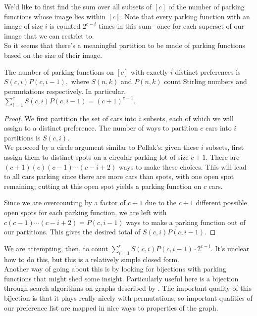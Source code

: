 We'd like to first find the sum over all subsets of $[c]$ of the number of parking functions whose image lies within $[c].$ Note that every parking function with an image of size $i$ is counted $2^{c-i}$ times in this sum-- once for each superset of our image that we can restrict to.\\

So it seems that there's a meaningful partition to be made of parking functions based on the size of their image.

\begin{proposition}
    The number of parking functions on $[c]$ with exactly $i$ distinct preferences is $S(c,i)P(c,i-1),$ where $S(n,k)$ and $P(n,k)$ count Stirling numbers and permutations respectively. In particular, $\displaystyle\sum_{i=1}^{c}S(c,i)P(c,i-1)=(c+1)^{c-1}.$
\end{proposition}

\begin{proof}
    We first partition the set of cars into $i$ subsets, each of which we will assign to a distinct preference. The number of ways to partition $c$ cars into $i$ partitions is $S(c,i).$\\

    We proceed by a circle argument similar to Pollak's: given these $i$ subsets, first assign them to distinct spots on a circular parking lot of size $c+1.$ There are $(c+1)(c)(c-1)\cdots(c-i+2)$ ways to make these choices. This will lead to all cars parking since there are more cars than spots, with one open spot remaining; cutting at this open spot yields a parking function on $c$ cars.

    Since we are overcounting by a factor of $c+1$ due to the $c+1$ different possible open spots for each parking function, we are left with $c(c-1)\cdots(c-i+2)=P(c,i-1)$ ways to make a parking function out of our partitions. This gives the desired total of $S(c,i)P(c,i-1).$
\end{proof}

We are attempting, then, to count $\displaystyle\sum_{i=1}^{c}S(c,i)P(c,i-1)\cdot 2^{c-i}.$ It's unclear how to do this, but this is a relatively simple closed form.\\

Another way of going about this is by looking for bijections with parking functions that might shed some insight. Particularly useful here is a bijection through search algorithms on graphs described by \cite{yan-2015}. The important quality of this bijection is that it plays really nicely with permutations, so important qualities of our preference list are mapped in nice ways to properties of the graph.\\

